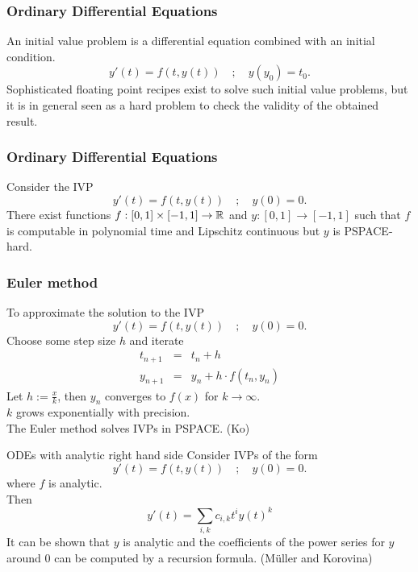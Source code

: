 \begin{frame}[<+->]
\frametitle{Ordinary Differential Equations}
An initial value problem is a differential equation combined with an initial 
condition.
$$
y'(t)=f(t,y(t)) \quad;\quad y(y_0)=t_0.
$$
\pause
Sophisticated floating point recipes exist to solve such initial value problems, but it is in general seen as a 
hard problem to check the validity of the obtained result.
\end{frame}
\begin{frame}
\frametitle{Ordinary Differential Equations}
\begin{theorem}[Kawamura, 2010]
Consider the IVP
$$
y'(t)=f(t,y(t)) \quad;\quad y(0)=0.
$$
\pause
There exist functions $f: [0,1] \times [-1,1] \to \mathbb{R}$ and $y: [0,1] \to [-1,1]$
such that $f$ is computable in polynomial time and Lipschitz continuous
but $y$ is PSPACE-hard.
\end{theorem}
\end{frame}
\begin{frame}
\frametitle{Euler method}
To approximate the solution to the IVP
$$
y'(t)=f(t,y(t)) \quad;\quad y(0)=0.
$$
\pause
Choose some step size $h$ and iterate 
\begin{eqnarray*}
t_{n+1} &=& t_n+h \\
y_{n+1} &=& y_n + h\cdot f(t_n, y_n) 
\end{eqnarray*}
\pause
Let $h := \frac{x}{k}$, then $y_n$ converges to $f(x)$ for $k \to \infty$.\\
\pause
$k$ grows exponentially with precision.\\ \pause
The Euler method solves IVPs in PSPACE. (Ko)
\end{frame}
\begin{frame}[t]{ODEs with analytic right hand side}
 Consider IVPs of the form 
$$
y'(t)=f(t,y(t)) \quad;\quad y(0)=0.
$$
where $f$ is analytic.\\ \pause
Then 
$$
y'(t)=\sum_{i,k} c_{i,k}t^iy(t)^k
$$
\pause
It can be shown that $y$ is analytic and the coefficients of the power series for $y$ around $0$ can be computed by a recursion formula. (M\"{u}ller and Korovina)
\end{frame}
